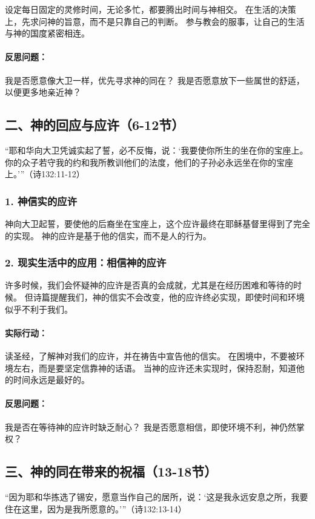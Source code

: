 \documentclass[a4paper, 12pt]{article}
\begin{document}
设定每日固定的灵修时间，无论多忙，都要腾出时间与神相交。
在生活的决策上，先求问神的旨意，而不是只靠自己的判断。
参与教会的服事，让自己的生活与神的国度紧密相连。
\paragraph*{反思问题：}

我是否愿意像大卫一样，优先寻求神的同在？
我是否愿意放下一些属世的舒适，以便更多地亲近神？
\subsection*{二、神的回应与应许（6-12节）}
“耶和华向大卫凭诚实起了誓，必不反悔，说：‘我要使你所生的坐在你的宝座上。你的众子若守我的约和我所教训他们的法度，他们的子孙必永远坐在你的宝座上。’”（诗132:11-12）

\subsubsection*{1. 神信实的应许}
神向大卫起誓，要使他的后裔坐在宝座上，这个应许最终在耶稣基督里得到了完全的实现。
神的应许是基于他的信实，而不是人的行为。
\subsubsection*{2. 现实生活中的应用：相信神的应许}
许多时候，我们会怀疑神的应许是否真的会成就，尤其是在经历困难和等待的时候。
但诗篇提醒我们，神的信实不会改变，他的应许终必实现，即使时间和环境似乎不利于我们。
\paragraph*{实际行动：}

读圣经，了解神对我们的应许，并在祷告中宣告他的信实。
在困境中，不要被环境左右，而是要坚定信靠神的话语。
当神的应许还未实现时，保持忍耐，知道他的时间永远是最好的。
\paragraph*{反思问题：}

我是否在等待神的应许时缺乏耐心？
我是否愿意相信，即使环境不利，神仍然掌权？
\subsection*{三、神的同在带来的祝福（13-18节）}
“因为耶和华拣选了锡安，愿意当作自己的居所，说：‘这是我永远安息之所，我要住在这里，因为是我所愿意的。’”（诗132:13-14）
\end{document}
